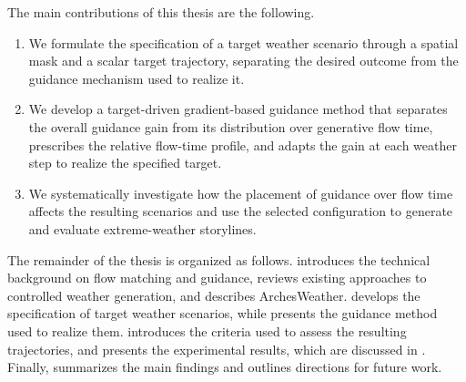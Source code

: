 The main contributions of this thesis are the following.

\begin{enumerate}[noitemsep]
    \item We formulate the specification of a target weather scenario through a
    spatial mask and a scalar target trajectory, separating the desired outcome
    from the guidance mechanism used to realize it.

    \item We develop a target-driven gradient-based guidance method that
    separates the overall guidance gain from its distribution over generative
    flow time, prescribes the relative flow-time profile, and adapts the gain at
    each weather step to realize the specified target.

    \item We systematically investigate how the placement of guidance over flow
    time affects the resulting scenarios and use the selected configuration to
    generate and evaluate extreme-weather storylines.
\end{enumerate}

The remainder of the thesis is organized as follows.
 introduces the technical background on flow matching and
guidance, reviews existing approaches to controlled weather generation, and
describes ArchesWeather.  develops the specification of target
weather scenarios, while  presents the guidance method used to
realize them.  introduces the criteria used to assess the
resulting trajectories, and  presents the experimental
results, which are discussed in . Finally,
 summarizes the main findings and outlines directions for
future work.